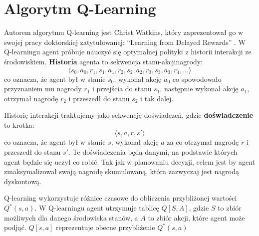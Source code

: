 \documentclass[a4paper, 12pt,twoside]{report}
\begin{document}
\chapter{Algorytm Q-Learning}
\label{chapter:qlearning}
Autorem algorytmu Q-learning jest Christ Watkins, który zaprezentował go w
swojej pracy doktorskiej zatytułowanej: ``Learning from Delayed
Rewards'' \cite{qlearning_inventor}.
W Q-learningu agent próbuje nauczyć się optymalnej polityki z historii
interakcji ze środowiskiem. \textbf{Historia} agenta to sekwencja
stanu-akcji\dywiz nagrody:
\[\langle s_0, a_0, r_1, s_1, a_1, r_2, s_2, a_2, r_3, s_3, a_3, r_4, \dots
\rangle\]
co oznacza, że agent był w stanie $s_0$, wykonał akcję $a_0$ co spowodowało
przyznaniem mu nagrody $r_1$ i przejścia do stanu $s_1$, następnie wykonał
akcję $a_1$, otrzymał nagrodę $r_2$ i przeszedł do stanu $s_2$ i tak dalej.

Historię interakcji traktujemy jako sekwencję doświadczeń, gdzie
\textbf{doświadczenie} to krotka:
\[\langle s, a, r, s' \rangle\]
co oznacza, że agent był w stanie $s$, wykonał akcję $a$ za co otrzymał nagrodę
$r$ i przeszedł do stanu $s'$. Te doświadczenia będą danymi, na podstawie
których agent będzie się uczył co robić. Tak jak w planowaniu decyzji, celem
jest by agent zmaksymalizował swoją nagrodę skumulowaną, która zazwyczaj jest
nagrodą dyskontową.

Q-learning wykorzystuje różnice czasowe do obliczenia przybliżonej wartości
$Q^*(s, a)$. W Q-learningu agent utrzymuje tablicę $Q[S,A]$, gdzie $S$ to zbiór
możliwych dla danego środowiska stanów, a $A$ to zbiór akcji, które agent może
podjąć. $Q[s,a]$ reprezentuje obecne przybliżenie $Q^*(s,a)$
\end{document}
